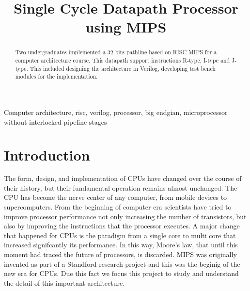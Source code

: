 \documentclass[conference]{IEEEtran}
\begin{document}
\title{Single Cycle Datapath Processor using MIPS\\
}

\author{
\and
{}
}

\maketitle

\begin{abstract}
Two undergraduates implemented a 32 bits pathline based on RISC MIPS for a computer architecture course. This datapath support instructions R-type, I-type and J-type. This included designing the architecture in Verilog, developing test bench modules for the implementation.
\end{abstract}

\begin{IEEEkeywords}
Computer architecture, risc, verilog, processor, big endgian, microprocessor without interlocked pipeline stages
\end{IEEEkeywords}

\section{Introduction}	%
The form, design, and implementation of CPUs have changed over the course of their history, but their
fundamental operation remains almost unchanged. The CPU has become the nerve center of any computer,
from mobile devices to supercomputers. From the beginning	of computer era scientists have tried to improve
processor performance not only increasing the number of transistors, but also by improving the instructions
that the processor executes. A major change that happened for CPUs is the paradigm from a single core to multi core that increased signifcantly its performance. In this way, Moore's law, that until this moment had traced the future of processors,
is discarded.
MIPS was originally invented as part of a Standford research project \cite{b1} and this was the beginig of the new era for CPUs. Due this fact we focus this project to study and understand the detail of this important architecture.
\end{document}

